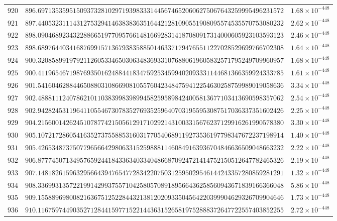 \documentclass[12pt,reqno]{amsart}
\theoremstyle{remark}
\begin{document}
\begin{longtable}{clc}
$920$ & $896.6971353595150937328102971939833314456746520606275067643259995496231572$ & $1.68\times 10^{-448}$ \\
$921$ & $897.4405323111431275329414638383635164421281090551908095574535570753080232$ & $2.62\times 10^{-448}$ \\
$922$ & $898.0904689234322886651977095766148166928314187080917314000605923103593123$ & $2.46\times 10^{-448}$ \\
$923$ & $898.6897644034168769915713679383588501463371794765511227028529699766702308$ & $1.64\times 10^{-448}$ \\
$924$ & $900.3208589919792112605334650306348369331076880619605832571795249709960957$ & $1.68\times 10^{-448}$ \\
$925$ & $900.4119654671987693501624884418347592534599402093331144681366359924333785$ & $1.61\times 10^{-448}$ \\
$926$ & $901.5416046288446508803108669081055760423484759412254630258759989019058636$ & $3.34\times 10^{-448}$ \\
$927$ & $902.4888111240786210110383998398994582595898424005813677103413690598357062$ & $2.54\times 10^{-448}$ \\
$928$ & $902.9428245311964110554673078352769352596407031955953087517036337351602426$ & $2.25\times 10^{-448}$ \\
$929$ & $904.2156001426245107877421505612917102921431003315676237129916261990578380$ & $3.30\times 10^{-448}$ \\
$930$ & $905.1072172860541635273755885316031770540689119273536197798347672237198914$ & $1.40\times 10^{-448}$ \\
$931$ & $905.4265348737507796566429806331525988811460849163936704846636509048663232$ & $2.22\times 10^{-448}$ \\
$932$ & $906.8777450713495765924418433634033404866870924721414752150512647782465326$ & $2.19\times 10^{-448}$ \\
$933$ & $907.1481826159632956643947654772834220750312595029546144243357280859281291$ & $1.32\times 10^{-448}$ \\
$934$ & $908.3369931357221991429937557104258057089189566436258560943671839166366048$ & $5.86\times 10^{-448}$ \\
$935$ & $909.1558896980082163675125228443213812020933504564220399904629326709904646$ & $1.73\times 10^{-448}$ \\
$936$ & $910.1167597449035271284415977152214436315265819752888372647722557403852255$ & $2.72\times 10^{-448}$ \\

\end{longtable}
\end{document}
